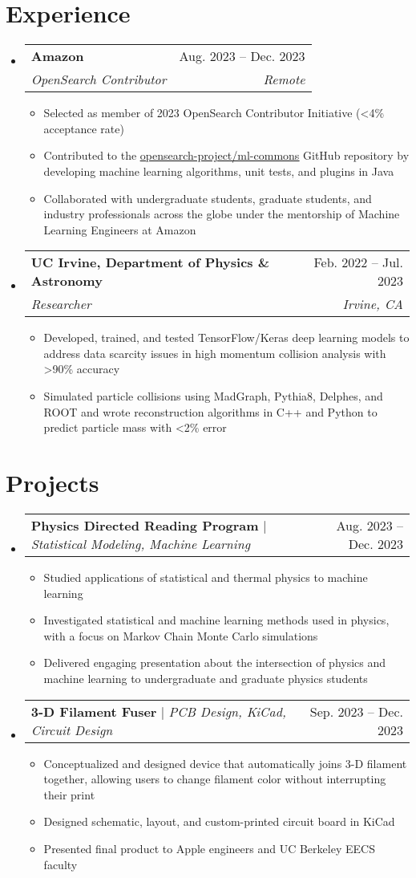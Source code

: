 \documentclass[letterpaper,11pt]{article}
\makeatletter
\newcommand{\resumeItem}[1]{
  \item\small{
    {#1 \vspace{-2pt}}
  }
}
\newcommand{\resumeSubheading}[4]{
  \vspace{-2pt}\item
    \begin{tabular*}{0.97\textwidth}[t]{l@{\extracolsep{\fill}}r}
      \textbf{#1} & #2 \\
      \textit{\small#3} & \textit{\small #4} \\
    \end{tabular*}\vspace{-7pt}
}
\newcommand{\resumeProjectHeading}[2]{
    \item
    \begin{tabular*}{0.97\textwidth}{l@{\extracolsep{\fill}}r}
      \small#1 & #2 \\
    \end{tabular*}\vspace{-7pt}
}
\newcommand{\resumeSubHeadingListStart}{\begin{itemize}[leftmargin=0.15in, label={}]}
\newcommand{\resumeSubHeadingListEnd}{\end{itemize}}
\newcommand{\resumeItemListStart}{\begin{itemize}}
\newcommand{\resumeItemListEnd}{\end{itemize}\vspace{-5pt}}
\makeatother
\begin{document}
\section{Experience}
  \resumeSubHeadingListStart
    \resumeSubheading
      {Amazon}{Aug. 2023 -- Dec. 2023}
      {OpenSearch Contributor}{Remote}
      \resumeItemListStart
        \resumeItem{Selected as member of 2023 OpenSearch Contributor Initiative (\textless 4\% acceptance rate)}
        \resumeItem{Contributed to the \href{https://github.com/opensearch-project/ml-commons/}{\underline{opensearch-project/ml-commons}} GitHub repository by developing machine learning algorithms, unit tests, and plugins in Java}
        \resumeItem{Collaborated with undergraduate students, graduate students, and industry professionals across the globe under the mentorship of Machine Learning Engineers at Amazon}
      \resumeItemListEnd
  \resumeSubHeadingListEnd

  \resumeSubHeadingListStart
    \resumeSubheading
      {UC Irvine, Department of Physics \& Astronomy}{Feb. 2022 -- Jul. 2023}
      {Researcher}{Irvine, CA}
      \resumeItemListStart
        \resumeItem{Developed, trained, and tested TensorFlow/Keras deep learning models to address data scarcity issues in high momentum collision analysis with \textgreater 90\% accuracy}
        \resumeItem{Simulated particle collisions using MadGraph, Pythia8, Delphes, and ROOT and wrote reconstruction algorithms in C++ and Python to predict particle mass with \textless 2\% error}
      \resumeItemListEnd
  \resumeSubHeadingListEnd

\section{Projects}
  \resumeSubHeadingListStart
    \resumeProjectHeading
      {\textbf{Physics Directed Reading Program} $|$ \emph{Statistical Modeling, Machine Learning}}{Aug. 2023 -- Dec. 2023}
      \resumeItemListStart
        \resumeItem{Studied applications of statistical and thermal physics to machine learning}
        \resumeItem{Investigated statistical and machine learning methods used in physics, with a focus on Markov Chain Monte Carlo simulations}
        \resumeItem{Delivered engaging presentation about the intersection of physics and machine learning to undergraduate and graduate physics students}
      \resumeItemListEnd
  \resumeSubHeadingListEnd

  \resumeSubHeadingListStart
    \resumeProjectHeading
      {\textbf{3-D Filament Fuser} $|$ \emph{PCB Design, KiCad, Circuit Design}}{Sep. 2023 -- Dec. 2023}
      \resumeItemListStart
        \resumeItem{Conceptualized and designed device that automatically joins 3-D filament together, allowing users to change filament color without interrupting their print}
        \resumeItem{Designed schematic, layout, and custom-printed circuit board in KiCad}
        \resumeItem{Presented final product to Apple engineers and UC Berkeley EECS faculty}
      \resumeItemListEnd
  \resumeSubHeadingListEnd
\end{document}
